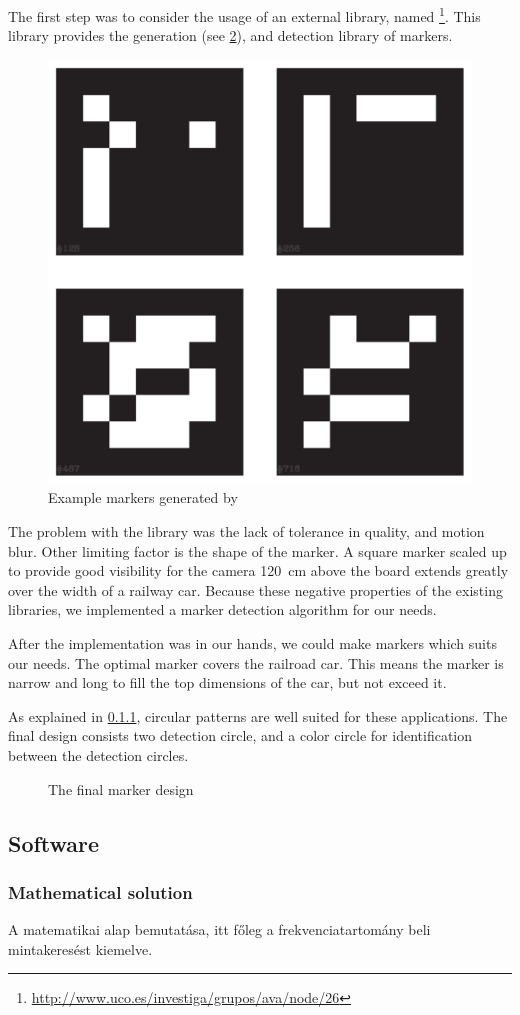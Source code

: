 The first step was to consider the usage of an external library, named \footnote{\url{http://www.uco.es/investiga/grupos/ava/node/26}}. This library provides the generation (see \cref{fig:aruco_markers}), and detection library of markers.

\begin{figure}[h]
	\centering
	\label{fig:aruco_markers}
	\includegraphics[width=0.35\linewidth]{include/figures/chapter_6/opencv_2}
	\caption{Example markers generated by }
\end{figure}

The problem with the library was the lack of tolerance in quality, and motion blur. Other limiting factor is the shape of the marker. A square marker scaled up to provide good visibility for the camera 120~\si{\centi\meter} above the board extends greatly over the width of a railway car. Because these negative properties of the existing libraries, we implemented a marker detection algorithm for our needs.

After the implementation was in our hands, we could make markers which suits our needs. The optimal marker covers the railroad car. This means the marker is narrow and long to fill the top dimensions of the car, but not exceed it.

As explained in \cref{fig:opencv_math}, circular patterns are well suited for these applications. The final design consists two detection circle, and a color circle for identification between the detection circles.

\begin{figure}[h]
	\centering
	\label{fig:aruco_markers}
	\caption{The final marker design}
\end{figure}

\subsection{Software}

\subsubsection{Mathematical solution}
\label{fig:opencv_math}
A matematikai alap bemutatása, itt főleg a frekvenciatartomány beli mintakeresést kiemelve.
